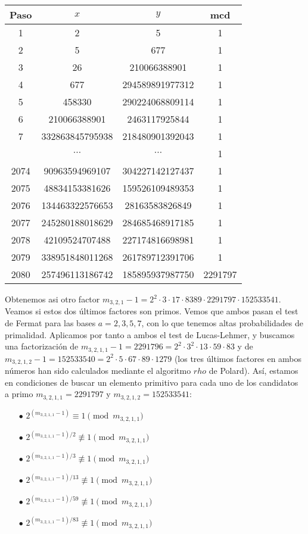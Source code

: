 \documentclass[fleqn]{article}
\begin{document}
    \begin{center}
        \begin{tabular}{| c | c | c | c |}
            \hline Paso & $x$ & $y$ & mcd \\ \hline
            1 & 2 & 5 & 1 \\
            2 & 5 & 677 & 1 \\
            3 & 26 & 210066388901 & 1 \\
            4 & 677 & 294589891977312 & 1 \\
            5 & 458330 & 290224068809114 & 1 \\
            6 & 210066388901 & 2463117925844 & 1 \\
            7 & 332863845795938 & 218480901392043 & 1 \\
            & $\cdots$ & $\cdots$ & 1 \\
            2074 & 90963594969107 & 304227142127437 & 1 \\
            2075 & 48834153381626 & 159526109489353 & 1 \\
            2076 & 134463322576653 & 28163583826849 & 1 \\
            2077 & 245280188018629 & 284685468917185 & 1 \\
            2078 & 42109524707488 & 227174816698981 & 1 \\
            2079 & 338951848011268 & 261789712391706 & 1 \\
            2080 & 257496113186742 & 185895937987750 & 2291797 \\ \hline
        \end{tabular}
    \end{center}
    Obtenemos asi otro factor $m_{3,2,1} -1 = 2^2 \cdot 3 \cdot 17 \cdot 8389 \cdot 2291797 \cdot 152533541$. Veamos si estos dos últimos factores son primos.
    Vemos que ambos pasan el test de Fermat para las bases $a = 2,3,5,7$, con lo que tenemos altas probabilidades de primalidad. Aplicamos por tanto a ambos
    el test de Lucas-Lehmer, y buscamos una factorización de 
    $m_{3,2,1,1} -1 = 2291796 = 2^2 \cdot 3^2 \cdot 13 \cdot 59 \cdot 83$ y de 
    $m_{3,2,1,2} -1 = 152533540 = 2^2 \cdot 5 \cdot 67 \cdot 89 \cdot 1279$ (los tres últimos factores en ambos números han sido calculados mediante el algoritmo 
    $rho$ de Polard). Así, estamos en condiciones de buscar un elemento primitivo para cada uno de los candidatos a primo $m_{3,2,1,1} = 2291797$ y $m_{3,2,1,2} = 152533541$:
    \begin{enumerate}
        \item[$\bullet$] $2^{(m_{3,2,1,1} - 1)} \equiv 1 \pmod{m_{3,2,1,1}}$
        \item[$\bullet$] $2^{(m_{3,2,1,1} - 1)/2} \not\equiv 1 \pmod{m_{3,2,1,1}}$    
        \item[$\bullet$] $2^{(m_{3,2,1,1} - 1)/3} \not\equiv 1 \pmod{m_{3,2,1,1}}$
        \item[$\bullet$] $2^{(m_{3,2,1,1} - 1)/13} \not\equiv 1 \pmod{m_{3,2,1,1}}$
        \item[$\bullet$] $2^{(m_{3,2,1,1} - 1)/59} \not\equiv 1 \pmod{m_{3,2,1,1}}$
        \item[$\bullet$] $2^{(m_{3,2,1,1} - 1)/83} \not\equiv 1 \pmod{m_{3,2,1,1}}$
    \end{enumerate}
\end{document}
